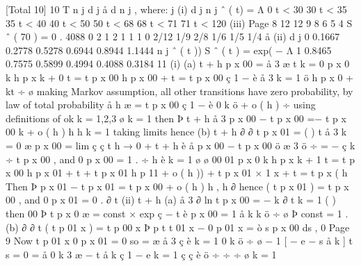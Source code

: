 [Total 10]
10
T
n j
d j
å d n
j
, where:
j
(i)
d j n j
ˆ ( t) =
Λ
0 \leq t < 30
30 \leq t < 35
35 \leq t < 40
40 \leq t < 50
50 \leq t < 68
68 \leq t < 71
71 \leq t < 120
(iii)
Page 8
12
12
9
8
6
5
4
S ˆ ( 70 ) = 0 . 4088
0
2
1
2
1
1
1
0
2/12
1/9
2/8
1/6
1/5
1/4
å
(ii)
d j
0
0.1667
0.2778
0.5278
0.6944
0.8944
1.1444
n j
ˆ ( t ))
S ˆ ( t ) = exp( − Λ
1
0.8465
0.7575
0.5899
0.4994
0.4088
0.3184%
11
(i) (a)
t + h
p x 00 =
å
3
æ
t
k = 0
p x 0 k h p x k + 0 t = t p x 00 h p x 00 + t = t p x 00 ç 1 −
è
å
3
k = 1
ö
h
p x 0 + kt ÷
ø
making Markov assumption, all other transitions have zero probability,
by law of total probability
å h 
æ
= t p x 00 ç 1 −
è
0 k
ö
+ o ( h ) ÷ using definitions of \mu ok k = 1,2,3
ø
k = 1
then
Þ
t + h
å
3
p x 00 − t p x 00
=− t p x 00  k + o ( h ) h
h
k = 1
taking limits
hence
(b)
t + h
∂
∂ t
p x 01 =
(
)
t
å
3
k = 0
æ
p x 00 = lim ç ç
t
h → 0 +
t + h
è
å
p x 00 − t p x 00 ö
æ 3
ö
÷ = − ç
 k ÷ t p x 00 , and 0 p x 00 = 1 .
÷
h
è k = 1
ø
ø
00
01
p x 0 k h p x k + 1 t = t p x 00 h p x 01 + t + t p x 01 h p 11
+ o ( h )) + t p x 01 × 1
x + t = t p x ( h \mu
Then
Þ
p x 01 − t p x 01
=  t p x 00 + o ( h ) h ,
h
∂
hence
( t p x 01 ) =  t p x 00 , and 0 p x 01 = 0 .
∂ t
(ii)
t + h
(a)
å
3
∂
ln t p x 00 = −  k
∂ t
k = 1
(
)
then
00
Þ t p x
0
æ
= const × exp ç − t
è
p x 00 = 1
å  k
k
ö
÷
ø
Þ const = 1 .
(b)
∂
∂ t
(
t
p
01
x
) = 
t
p
00
x
Þ p
t
t
01
x
− 0 p
01
x
= 
ò
s
p x 00 ds ,
0
Page 9%
Now
t
p
01
x
0
p x 01 = 0 so
=  æ
å
3
\mu
ç
è k = 1
0 k
ö
÷
ø
− 1
[ − e
− s å  k
]
t
s = 0
=
å 
0 k
3
æ
− t å  k
ç
1 − e k = 1
ç
ç
è
ö
÷
÷
÷
ø
k = 1
